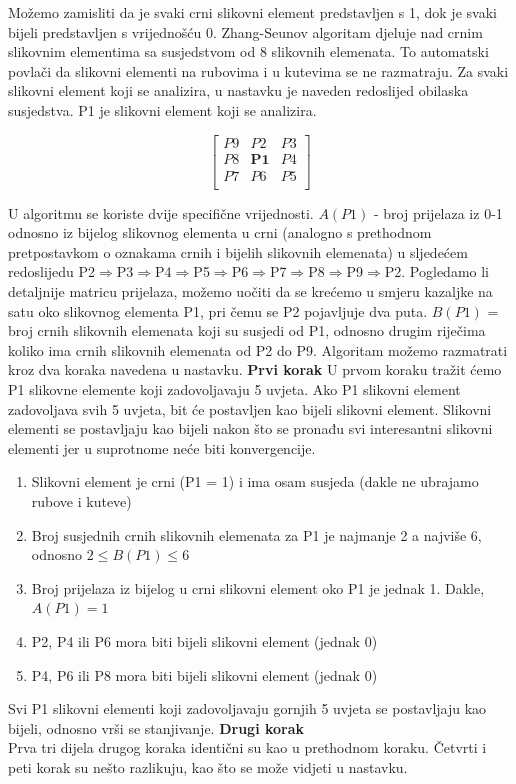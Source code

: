 \documentclass[times, utf8, diplomski]{fer}
\theoremstyle{definition}
\begin{document}
Možemo zamisliti da je svaki crni slikovni element predstavljen s 1, dok je svaki bijeli predstavljen s vrijednošću 0. Zhang-Seunov algoritam djeluje nad crnim slikovnim elementima sa susjedstvom od 8 slikovnih elemenata. To automatski povlači da slikovni elementi na rubovima i u kutevima se ne razmatraju. Za svaki slikovni element koji se analizira, u nastavku je naveden redoslijed obilaska susjedstva. P1 je slikovni element koji se analizira.

\[
\begin{bmatrix}
P9 & P2 & P3 \\
P8 & \textbf{P1} & P4 \\
P7 & P6 & P5 \\
\end{bmatrix}
\]

U algoritmu se koriste dvije specifične vrijednosti.\newline
$A(P1)$ - broj prijelaza iz 0-1 odnosno iz bijelog slikovnog elementa u crni (analogno s prethodnom pretpostavkom o oznakama crnih i bijelih slikovnih elemenata) u sljedećem redoslijedu P2$\Rightarrow$P3$\Rightarrow$P4$\Rightarrow$P5$\Rightarrow$P6$\Rightarrow$P7$\Rightarrow$P8$\Rightarrow$P9$\Rightarrow$P2. Pogledamo li detaljnije matricu prijelaza, možemo uočiti da se krećemo u smjeru kazaljke na satu oko slikovnog elementa P1, pri čemu se P2 pojavljuje dva puta.\newline
$B(P1)$ = broj crnih slikovnih elemenata koji su susjedi od P1, odnosno drugim riječima koliko ima crnih slikovnih elemenata od P2 do P9.
\newline
\newline
Algoritam možemo razmatrati kroz dva koraka navedena u nastavku.
\newline
\textbf{Prvi korak}
\newline
U prvom koraku tražit ćemo P1 slikovne elemente koji zadovoljavaju 5 uvjeta. Ako P1 slikovni element zadovoljava svih 5 uvjeta, bit će postavljen kao bijeli slikovni element. Slikovni elementi se postavljaju kao bijeli nakon što se pronađu svi interesantni slikovni elementi jer u suprotnome neće biti konvergencije.

\begin{enumerate}
\item Slikovni element je crni (P1 = 1) i ima osam susjeda (dakle ne ubrajamo rubove i kuteve)
\item Broj susjednih crnih slikovnih elemenata  za P1 je najmanje 2 a najviše 6, odnosno $2\leq B(P1)\leq6$
\item Broj prijelaza iz bijelog u crni slikovni element oko P1 je jednak 1. Dakle, $A(P1) = 1$
\item P2, P4 ili P6 mora biti bijeli slikovni element (jednak 0)
\item P4, P6 ili P8 mora biti bijeli slikovni element (jednak 0)
\end{enumerate}
Svi P1 slikovni elementi koji zadovoljavaju gornjih 5 uvjeta se postavljaju kao bijeli, odnosno vrši se stanjivanje.
\newline
\textbf{Drugi korak}
\\
Prva tri dijela drugog koraka identični su kao u prethodnom koraku. Četvrti i peti korak su nešto razlikuju, kao što se može vidjeti u nastavku.
\end{document}
